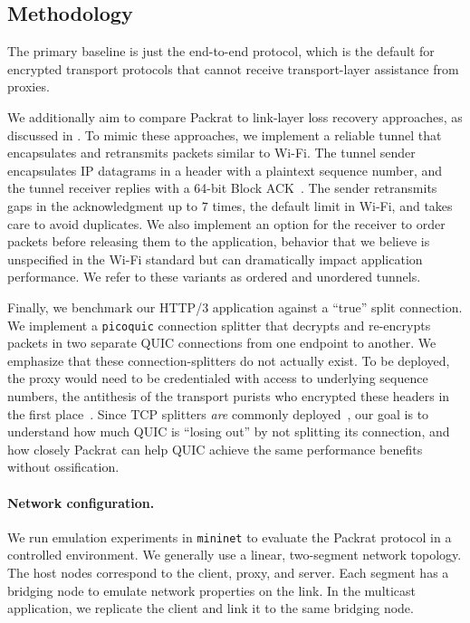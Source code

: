\subsection{Methodology}
\label{sec:packrat:evaluation:methodology}

The primary baseline is just the end-to-end protocol, which is the default for
encrypted transport protocols that cannot receive transport-layer assistance
from proxies.

We additionally aim to compare Packrat to link-layer loss recovery approaches,
as discussed in . To mimic these approaches, we
implement a reliable tunnel that encapsulates and retransmits packets similar
to Wi-Fi. The tunnel sender encapsulates IP datagrams in a header with a
plaintext sequence number, and the tunnel receiver replies with a 64-bit Block
ACK~\cite{ieee80211e}. The sender retransmits gaps in the acknowledgment up to
$7$ times, the default limit in Wi-Fi, and takes care to avoid duplicates. We
also implement an option for the receiver to order packets before releasing
them to the application, behavior that we believe is unspecified in the Wi-Fi
standard but can dramatically impact application performance. We refer to these
variants as ordered and unordered tunnels.

Finally, we benchmark our HTTP/3 application against a ``true'' split
connection. We implement a \texttt{picoquic} connection splitter that decrypts
and re-encrypts packets in two separate QUIC connections from one endpoint to
another. We emphasize that these connection-splitters do not actually exist. To
be deployed, the proxy would need to be credentialed with access to underlying
sequence numbers, the antithesis of the transport purists who encrypted these
headers in the first place~\cite{duke2023rfc}. Since TCP splitters \textit
{are} commonly deployed~\cite{honda2011still,rfc3135}, our goal is to
understand how much QUIC is ``losing out'' by not splitting its connection, and
how closely Packrat can help QUIC achieve the same performance benefits without
ossification.


\paragraph{Network configuration.}

We run emulation experiments in \texttt{mininet} to evaluate the Packrat protocol
in a controlled environment. We generally use a linear, two-segment network
topology.
The host nodes
correspond to the client, proxy, and server. Each segment has a bridging
node to emulate network properties on the link. In the multicast application,
we replicate the client and link it to the same bridging node.

